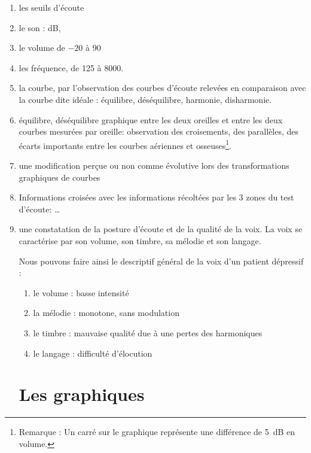   \begin{enumerate}
 	\item les seuils d'écoute
 	\item le son : dB, 
 	\item le volume de $-20$ à 90 %
 	\item les fréquence, de 125 à 8000.   \label{chapitre 6.2t} %
 	\item la courbe, par l'observation des courbes d'écoute relevées
 	en comparaison avec la courbe dite idéale : équilibre,
 	déséquilibre, harmonie, disharmonie.  
 	\item équilibre, déséquilibre graphique entre les deux oreilles et entre les deux courbes mesurées par oreille: observation des croisements, des parallèles, des
 	écarts importants entre les courbes aériennes et osseuses\footnote{Remarque :
 		Un carré sur le graphique représente une différence de \SI{5}{\dB} en
 		volume.}.
 	\item une modification perçue ou non comme évolutive lors des transformations graphiques de courbes
 	\item  Informations croisées avec les informations récoltées   par les 3 
 	zones du test d'écoute: \ldots{}
 	\item une constatation de la posture d'écoute et de la qualité de
 	la voix. La voix se caractérise par son volume, son timbre, sa mélodie et son langage. 
 	
 	
 Nous pouvons faire ainsi le descriptif général de la voix d'un patient dépressif :
 	\begin{enumerate}
 		\item le volume : basse intensité
 		\item la mélodie : monotone, sans modulation
 		\item le timbre : mauvaise qualité due à une pertes des harmoniques
 		\item le langage : difficulté d'élocution
 	\end{enumerate}
 	
 		
 	
 	
 	
 	\section{Les graphiques}
 	
 	\lipsum[1]
 	

\end{enumerate}
